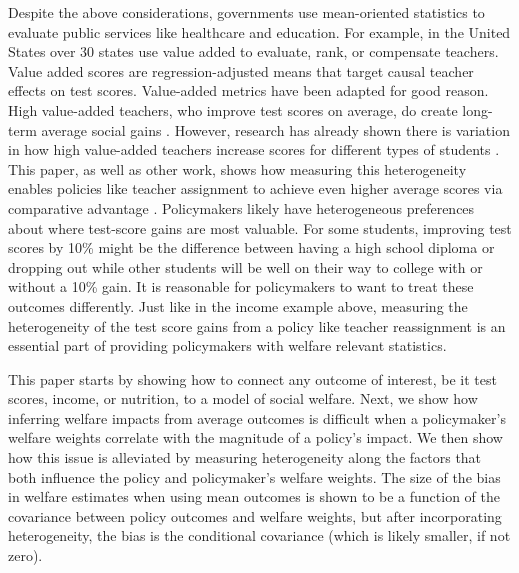 \documentclass[12pt]{article}
\theoremstyle{definition}
\theoremstyle{definition}
\theoremstyle{definition}
\theoremstyle{definition}
\begin{document}
    Despite the above considerations, governments use mean-oriented statistics to evaluate public services like healthcare and education. For example, in the United States over 30 states use value added to evaluate, rank, or compensate teachers. Value added scores are regression-adjusted means that target causal teacher effects on test scores. Value-added metrics have been adapted for good reason. High value-added teachers, who improve test scores on average, do create long-term average social gains \citep[e.g.,][]{chetty2014measuring2,pope2017multidimensional}. However, research has already shown there is variation in how high value-added teachers increase scores for different types of students \citep[as in][etc.]{Delgado2020,bates2022teacher}. This paper, as well as other work, shows how measuring this heterogeneity enables policies like teacher assignment to achieve even higher average scores via comparative advantage \citep{bates2022teacher, ahn2021importance}. Policymakers likely have heterogeneous preferences about where test-score gains are most valuable. For some students, improving test scores by 10\% might be the difference between having a high school diploma or dropping out while other students will be well on their way to college with or without a 10\% gain. It is reasonable for policymakers to want to treat these outcomes differently. Just like in the income example above, measuring the heterogeneity of the test score gains from a policy like teacher reassignment is an essential part of providing policymakers with welfare relevant statistics. 

    This paper starts by showing how to connect any outcome of interest, be it test scores, income, or nutrition, to a model of social welfare. Next, we show how inferring welfare impacts from average outcomes is difficult when a policymaker's welfare weights correlate with the magnitude of a policy's impact. We then show how this issue is alleviated by measuring heterogeneity along the factors that both influence the policy and policymaker's welfare weights. The size of the bias in welfare estimates when using mean outcomes is shown to be a function of the covariance between policy outcomes and welfare weights, but after incorporating heterogeneity, the bias is the conditional covariance (which is likely smaller, if not zero). 
\end{document}
